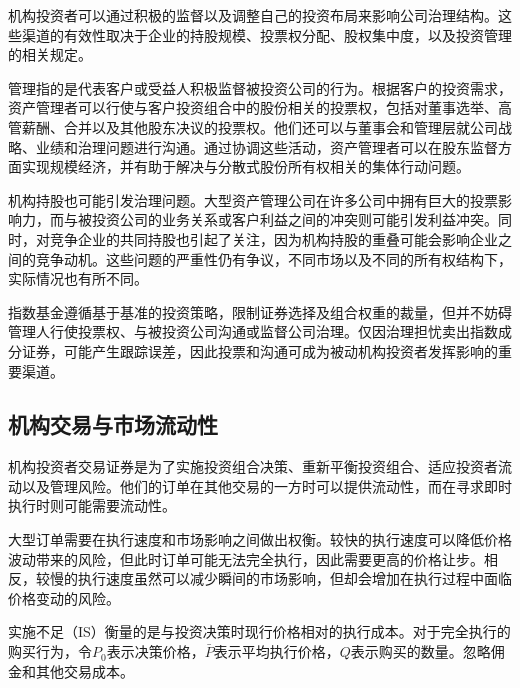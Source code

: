 机构投资者可以通过积极的监督以及调整自己的投资布局来影响公司治理结构。这些渠道的有效性取决于企业的持股规模、投票权分配、股权集中度，以及投资管理的相关规定。

管理指的是代表客户或受益人积极监督被投资公司的行为。根据客户的投资需求，资产管理者可以行使与客户投资组合中的股份相关的投票权，包括对董事选举、高管薪酬、合并以及其他股东决议的投票权。他们还可以与董事会和管理层就公司战略、业绩和治理问题进行沟通。通过协调这些活动，资产管理者可以在股东监督方面实现规模经济，并有助于解决与分散式股份所有权相关的集体行动问题。

机构持股也可能引发治理问题。大型资产管理公司在许多公司中拥有巨大的投票影响力，而与被投资公司的业务关系或客户利益之间的冲突则可能引发利益冲突。同时，对竞争企业的共同持股也引起了关注，因为机构持股的重叠可能会影响企业之间的竞争动机。这些问题的严重性仍有争议，不同市场以及不同的所有权结构下，实际情况也有所不同。

\begin{tcolorbox}[
  enhanced,
  breakable,
  colback=white,
  colframe=FinanceBlue,
  boxrule=0.7pt,
  sharp corners,
  borderline west={2.2pt}{0pt}{FinanceBlue},
  title=\textbf{财务视角：被动投资并不排除主动管理},
  coltitle=white,
  colbacktitle=FinanceBlue,
  fonttitle=\bfseries,
  before skip=1.2em,
  after skip=1.2em
]

指数基金遵循基于基准的投资策略，限制证券选择及组合权重的裁量，但并不妨碍管理人行使投票权、与被投资公司沟通或监督公司治理。仅因治理担忧卖出指数成分证券，可能产生跟踪误差，因此投票和沟通可成为被动机构投资者发挥影响的重要渠道。

\end{tcolorbox}

\subsection{机构交易与市场流动性}

机构投资者交易证券是为了实施投资组合决策、重新平衡投资组合、适应投资者流动以及管理风险。他们的订单在其他交易的一方时可以提供流动性，而在寻求即时执行时则可能需要流动性。

大型订单需要在执行速度和市场影响之间做出权衡。较快的执行速度可以降低价格波动带来的风险，但此时订单可能无法完全执行，因此需要更高的价格让步。相反，较慢的执行速度虽然可以减少瞬间的市场影响，但却会增加在执行过程中面临价格变动的风险。

实施不足（IS）衡量的是与投资决策时现行价格相对的执行成本。对于完全执行的购买行为，令$P_0$表示决策价格，$\bar{P}$表示平均执行价格，$Q$表示购买的数量。忽略佣金和其他交易成本。

